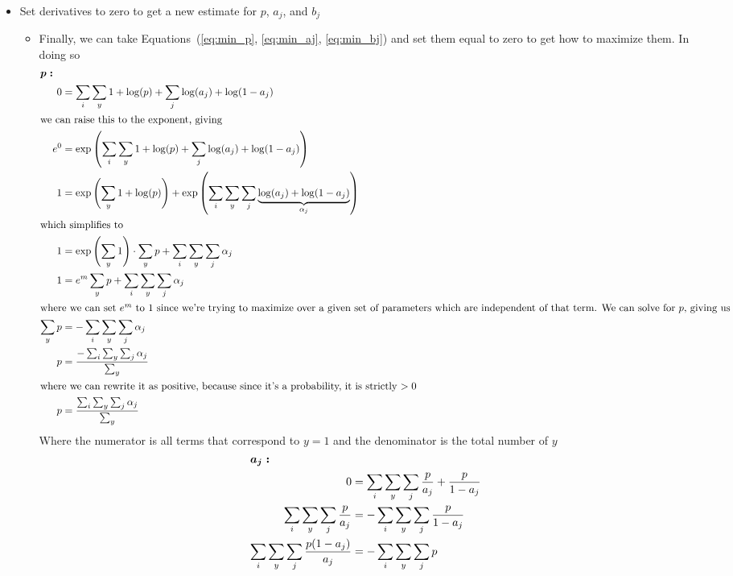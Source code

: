 \documentclass{article}
\newcommand{\bt}{\boldsymbol{\theta}}
\begin{document}
\begin{enumerate}
\begin{itemize}
\begin{itemize}
\begin{itemize}
\begin{align}
    \frac{\partial \bt_{(t+1)}}{\partial b_{j}} &= -\sum_{i}\sum_{y}\sum_{j}\frac{p}{b_{j}}+\frac{p}{1-b_{j}}\label{eq:min_bj}
  \end{align}
\end{itemize}
\item Set derivatives to zero to get a new estimate for $p$, $a_{j}$, and $b_{j}$
\begin{itemize}
  \item Finally, we can take Equations~(\ref{eq:min_p}, \ref{eq:min_aj}, \ref{eq:min_bj}) and set them equal to zero to get how to maximize them. In doing so
    \begin{align}
      \intertext{$\boldsymbol{p:}$}
      0 &= \sum_{i}\sum_{y}1+\log(p)+\sum_{j}\log(a_{j})+\log(1-a_{j})\\
      \intertext{we can raise this to the exponent, giving}
      e^{0} &= \exp\left(\sum_{i}\sum_{y}1+\log(p)+\sum_{j}\log(a_{j})+\log(1-a_{j})\right)\\
      1 &= \exp\left(\sum_{y}1+\log(p)\right)+\exp\left(\sum_{i}\sum_{y}\sum_{j}\underbrace{\log(a_{j})+\log(1-a_{j})}_{\alpha_{j}}\right)\\
      \intertext{which simplifies to}
      1 &= \exp\left(\sum_{y}1\right)\cdot \sum_{y}p + \sum_{i}\sum_{y}\sum_{j}\alpha_{j}\\
      1 &= e^{m}\sum_{y}p + \sum_{i}\sum_{y}\sum_{j}\alpha_{j}\\
      \intertext{where we can set $e^{m}$ to 1 since we're trying to maximize over a given set of parameters which are independent of that term. We can solve for $p$, giving us}
      \sum_{y}p &= -\sum_{i}\sum_{y}\sum_{j}\alpha_{j}\\
      p &= \frac{-\sum_{i}\sum_{y}\sum_{j}\alpha_{j}}{\sum_{y}}\\
      \intertext{where we can rewrite it as positive, because since it's a probability, it is strictly $>0$}
      p &= \frac{\sum_{i}\sum_{y}\sum_{j}\alpha_{j}}{\sum_{y}}
      \end{align}
      Where the numerator is all terms that correspond to $y=1$ and the denominator is the total number of $y$
      \begin{align}
      \intertext{$\boldsymbol{a_{j}:}$}
      0 &= \sum_{i}\sum_{y}\sum_{j}\frac{p}{a_{j}}+\frac{p}{1-a_{j}}\\
      \sum_{i}\sum_{y}\sum_{j}\frac{p}{a_{j}} &= -\sum_{i}\sum_{y}\sum_{j}\frac{p}{1-a_{j}}\\
      \sum_{i}\sum_{y}\sum_{j}\frac{p(1-a_{j})}{a_{j}} &= -\sum_{i}\sum_{y}\sum_{j}p\\

\end{align}
\end{itemize}
\end{itemize}
\end{itemize}
\end{enumerate}
\end{document}
